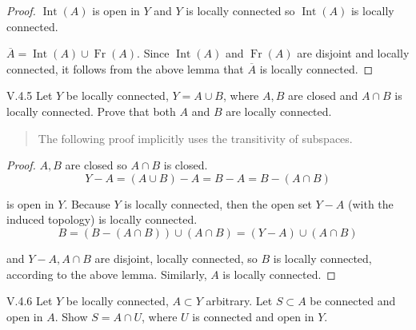 \begin{proof}
	\( \operatorname{Int}(A) \) is open in \( Y \) and \( Y \) is locally connected so \( \operatorname{Int}(A) \) is locally connected.

	\( \overline{A} = \operatorname{Int}(A) \cup \operatorname{Fr}(A) \). Since \( \operatorname{Int}(A) \) and \( \operatorname{Fr}(A) \) are disjoint and locally connected, it follows from the above lemma that \( \overline{A} \) is locally connected.
\end{proof}

\begin{problem}{V.4.5}
Let \( Y \) be locally connected, \( Y = A \cup B \), where \( A, B \) are closed and \( A \cap B \) is locally connected. Prove that both \( A \) and \( B \) are locally connected.
\end{problem}

\begin{quotation}
	The following proof implicitly uses the transitivity of subspaces.
\end{quotation}

\begin{proof}
	\( A, B \) are closed so \( A \cap B \) is closed.
	\[
		Y - A = (A \cup B) - A = B - A = B - (A \cap B)
	\]

	is open in \( Y \). Because \( Y \) is locally connected, then the open set \( Y - A \) (with the induced topology) is locally connected.
	\[
		B = (B - (A \cap B)) \cup (A \cap B) = (Y - A) \cup (A \cap B)
	\]

	and \( Y - A, A \cap B \) are disjoint, locally connected, so \( B \) is locally connected, according to the above lemma. Similarly, \( A \) is locally connected.
\end{proof}

\begin{problem}{V.4.6}
Let \(Y\) be locally connected, \( A \subset Y \) arbitrary. Let \( S \subset A \) be connected and open in \(A\). Show \( S = A \cap U \), where \( U \) is connected and open in \( Y \).
\end{problem}


